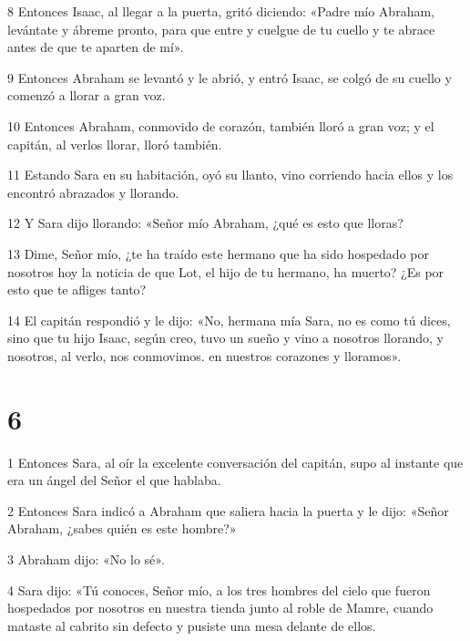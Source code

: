 \par 8 Entonces Isaac, al llegar a la puerta, gritó diciendo: «Padre mío Abraham, levántate y ábreme pronto, para que entre y cuelgue de tu cuello y te abrace antes de que te aparten de mí».

\par 9 Entonces Abraham se levantó y le abrió, y entró Isaac, se colgó de su cuello y comenzó a llorar a gran voz.

\par 10 Entonces Abraham, conmovido de corazón, también lloró a gran voz; y el capitán, al verlos llorar, lloró también.

\par 11 Estando Sara en su habitación, oyó su llanto, vino corriendo hacia ellos y los encontró abrazados y llorando.

\par 12 Y Sara dijo llorando: «Señor mío Abraham, ¿qué es esto que lloras?

\par 13 Dime, Señor mío, ¿te ha traído este hermano que ha sido hospedado por nosotros hoy la noticia de que Lot, el hijo de tu hermano, ha muerto? ¿Es por esto que te afliges tanto?

\par 14 El capitán respondió y le dijo: «No, hermana mía Sara, no es como tú dices, sino que tu hijo Isaac, según creo, tuvo un sueño y vino a nosotros llorando, y nosotros, al verlo, nos conmovimos. en nuestros corazones y lloramos».

\chapter{6}

\par 1 Entonces Sara, al oír la excelente conversación del capitán, supo al instante que era un ángel del Señor el que hablaba.

\par 2 Entonces Sara indicó a Abraham que saliera hacia la puerta y le dijo: «Señor Abraham, ¿sabes quién es este hombre?»

\par 3 Abraham dijo: «No lo sé».

\par 4 Sara dijo: «Tú conoces, Señor mío, a los tres hombres del cielo que fueron hospedados por nosotros en nuestra tienda junto al roble de Mamre, cuando mataste al cabrito sin defecto y pusiste una mesa delante de ellos.

